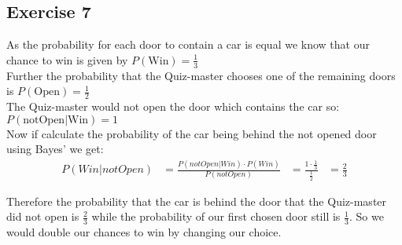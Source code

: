 \subsection*{Exercise 7}
As the probability for each door to contain a car is equal we know that our chance to win is given by $P(\mbox{Win}) = \frac{1} 3$\\
Further the probability that the Quiz-master chooses one of the remaining doors is
$P(\mbox{Open}) = \frac{1} 2$\\
The Quiz-master would not open the door which contains the car so: \\
$P(\mbox{notOpen}|\mbox{Win}) = 1$\\
Now if calculate the probability of the car being behind the not opened door using Bayes' we get:
\begin{align*}
& & P(Win|notOpen) & = \frac{P(notOpen|Win) \cdot P(Win)}{P(notOpen)} & = \frac{1 \cdot \frac{1}{3}}{\frac{1}{2}} &= \frac{2}{3}& &
\end{align*}

Therefore the probability that the car is behind the door that the Quiz-master did not open is $\frac{2}{3}$ while the probability of our first chosen door still is $\frac{1}{3}$. So we would double our chances to win by changing our choice.